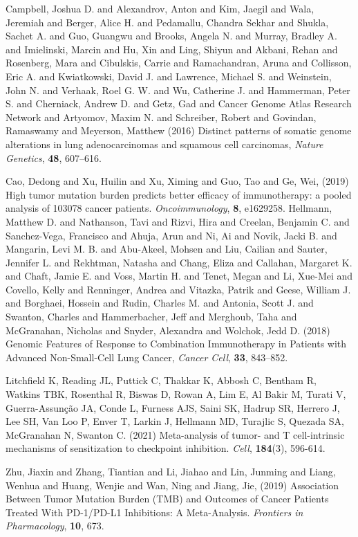 \documentclass[12pt]{article}
\begin{document}
\begin{thebibliography}{75}
 Campbell, Joshua D. and Alexandrov, Anton and Kim, Jaegil and Wala, Jeremiah and Berger, Alice H. and Pedamallu, Chandra Sekhar and Shukla, Sachet A. and Guo, Guangwu and Brooks, Angela N. and Murray, Bradley A. and Imielinski, Marcin and Hu, Xin and Ling, Shiyun and Akbani, Rehan and Rosenberg, Mara and Cibulskis, Carrie and Ramachandran, Aruna and Collisson, Eric A. and Kwiatkowski, David J. and Lawrence, Michael S. and Weinstein, John N. and Verhaak, Roel G. W. and Wu, Catherine J. and Hammerman, Peter S. and Cherniack, Andrew D. and Getz, Gad and {Cancer Genome Atlas Research Network} and Artyomov, Maxim N. and Schreiber, Robert and Govindan, Ramaswamy and Meyerson, Matthew (2016) Distinct patterns of somatic genome alterations in lung adenocarcinomas and squamous cell carcinomas, \emph{Nature Genetics}, \textbf{48}, 607--616.

 Cao, Dedong and Xu, Huilin and Xu, Ximing and Guo, Tao and Ge, Wei, (2019) High tumor mutation burden predicts better efficacy of immunotherapy: a pooled analysis of 103078 cancer patients. \textit{Oncoimmunology}, \textbf{8}, e1629258. 
 Hellmann, Matthew D. and Nathanson, Tavi and Rizvi, Hira and Creelan, Benjamin C. and Sanchez-Vega, Francisco and Ahuja, Arun and Ni, Ai and Novik, Jacki B. and Mangarin, Levi M. B. and Abu-Akeel, Mohsen and Liu, Cailian and Sauter, Jennifer L. and Rekhtman, Natasha and Chang, Eliza and Callahan, Margaret K. and Chaft, Jamie E. and Voss, Martin H. and Tenet, Megan and Li, Xue-Mei and Covello, Kelly and Renninger, Andrea and Vitazka, Patrik and Geese, William J. and Borghaei, Hossein and Rudin, Charles M. and Antonia, Scott J. and Swanton, Charles and Hammerbacher, Jeff and Merghoub, Taha and McGranahan, Nicholas and Snyder, Alexandra and Wolchok, Jedd D. (2018) Genomic {Features} of {Response} to {Combination} {Immunotherapy} in {Patients} with {Advanced} {Non}-{Small}-{Cell} {Lung} {Cancer}, \textit{Cancer Cell}, \textbf{33},	843--852.


 Litchfield K, Reading JL, Puttick C, Thakkar K, Abbosh C, Bentham R, Watkins TBK, Rosenthal R, Biswas D, Rowan A, Lim E, Al Bakir M, Turati V, Guerra-Assunção JA, Conde L, Furness AJS, Saini SK, Hadrup SR, Herrero J, Lee SH, Van Loo P, Enver T, Larkin J, Hellmann MD, Turajlic S, Quezada SA, McGranahan N, Swanton C. (2021) Meta-analysis of tumor- and T cell-intrinsic mechanisms of sensitization to checkpoint inhibition. \emph{Cell}, \textbf{184}(3), 596-614. 

 Zhu, Jiaxin and Zhang, Tiantian and Li, Jiahao and Lin, Junming and Liang, Wenhua and Huang, Wenjie and Wan, Ning and Jiang, Jie, (2019) Association {Between} {Tumor} {Mutation} {Burden} ({TMB}) and {Outcomes} of {Cancer} {Patients} {Treated} {With} {PD}-1/{PD}-{L1} {Inhibitions}: {A} {Meta}-{Analysis}. \textit{Frontiers in Pharmacology}, \textbf{10}, 673.

\end{thebibliography}

\clearpage
\end{document}
